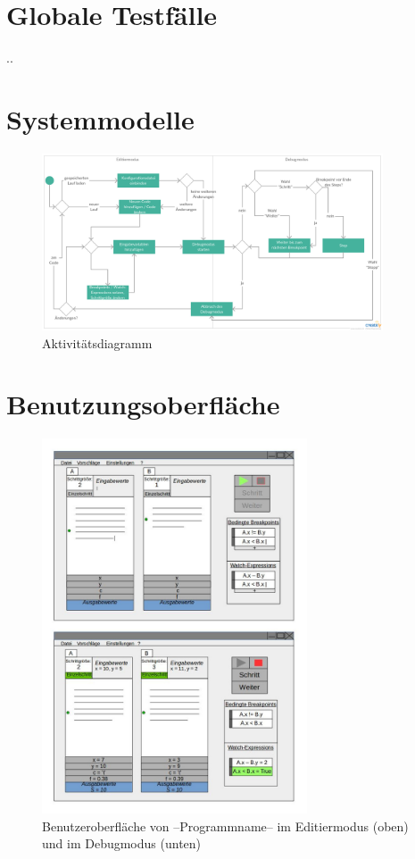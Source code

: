 \documentclass[parskip=full]{scrartcl}
\begin{document}
\section{Globale Testfälle}
..

\newpage
\section{Systemmodelle}
\begin{figure}[h] 
  \centering
     \includegraphics[width=0.9\textwidth]{Aktivitaetsdiagramm}
  \caption{Aktivitätsdiagramm}
  \label{fig:Bild1}
\end{figure}

\newpage
\section{Benutzungsoberfläche}
\begin{figure}[!ht] 
    \vspace{-10pt}
    \centering
       \includegraphics[width=0.7\textwidth]{skizzeFull.jpg}
       \caption{
         Benutzeroberfläche von --Programmname-- im Editiermodus (oben) und im Debugmodus
         (unten)
       }
    \label{fig:Bild1}
\end{figure}
\end{document}
